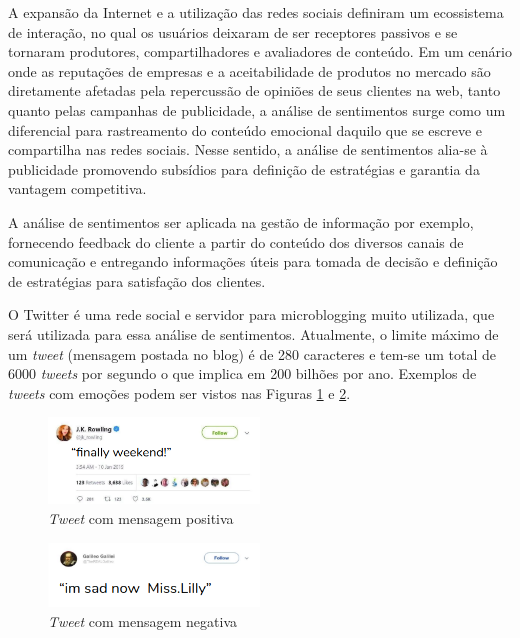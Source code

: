 \documentclass[conference]{IEEEtran}
\begin{document}
A expansão da Internet e a utilização das redes sociais definiram um ecossistema de interação, no qual os usuários deixaram de ser receptores passivos e se tornaram produtores, compartilhadores e avaliadores de conteúdo. Em um cenário onde as reputações de empresas e a aceitabilidade de produtos no mercado são diretamente afetadas pela repercussão de opiniões de seus clientes na web, tanto quanto pelas campanhas de publicidade, a análise de sentimentos surge como um diferencial para rastreamento do conteúdo emocional daquilo que se escreve e compartilha nas redes sociais. Nesse sentido, a análise de sentimentos alia-se à publicidade promovendo subsídios para definição de estratégias e garantia da vantagem competitiva.

A análise de sentimentos ser aplicada na gestão de informação por exemplo, fornecendo feedback do cliente a partir do conteúdo dos diversos canais de comunicação e entregando informações úteis para tomada de decisão e definição de estratégias para satisfação dos clientes.

O Twitter\cite{twitter} é uma rede social e servidor para microblogging muito utilizada, que será utilizada para essa análise de sentimentos. Atualmente, o limite máximo de um \textit{tweet} (mensagem postada no blog) é de 280 caracteres e tem-se um total de 6000 \textit{tweets} por segundo o que implica em 200 bilhões por ano. Exemplos de \textit{tweets} com emoções podem ser vistos nas Figuras \ref{fig:dataset_positivo} e \ref{fig:dataset_negativo}.

\begin{figure}[htbp]
	\includegraphics[width=0.5\textwidth,center]{imgs/tweet_positivo.png}
	\caption{\textit{Tweet} com mensagem positiva}
	\label{fig:dataset_positivo}
\end{figure}


\begin{figure}[htbp]
	\includegraphics[width=0.5\textwidth,center]{imgs/tweet_negativo.png}
	\caption{\textit{Tweet} com mensagem negativa}
	\label{fig:dataset_negativo}
\end{figure}
\end{document}

